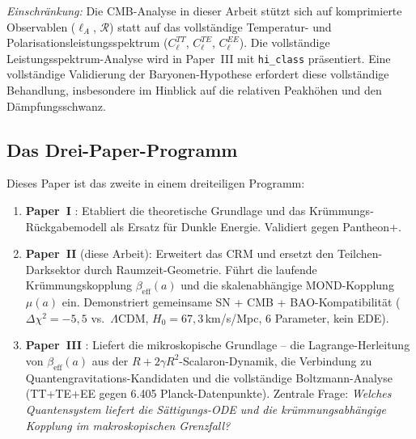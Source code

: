 \documentclass[aps,prd,twocolumn,superscriptaddress,nofootinbib,floatfix]{revtex4-2}
\begin{document}
\textit{Einschränkung:} Die CMB-Analyse in dieser Arbeit stützt sich auf komprimierte Observablen ($\ell_A$, $\mathcal{R}$) statt auf das vollständige Temperatur- und Polarisationsleistungsspektrum ($C_\ell^{TT}$, $C_\ell^{TE}$, $C_\ell^{EE}$). Die vollständige Leistungsspektrum-Analyse wird in Paper~III \cite{Geiger2026c} mit \texttt{hi\_class} präsentiert. Eine vollständige Validierung der Baryonen-Hypothese erfordert diese vollständige Behandlung, insbesondere im Hinblick auf die relativen Peakhöhen und den Dämpfungsschwanz.

\subsection{Das Drei-Paper-Programm}

Dieses Paper ist das zweite in einem dreiteiligen Programm:
\begin{enumerate}
\item \textbf{Paper~I} \cite{Geiger2026}: Etabliert die theoretische Grundlage und das Krümmungs-Rückgabemodell als Ersatz für Dunkle Energie. Validiert gegen Pantheon+.
\item \textbf{Paper~II} (diese Arbeit): Erweitert das CRM und ersetzt den Teilchen-Darksektor durch Raumzeit-Geometrie. Führt die laufende Krümmungskopplung $\beta_{\mathrm{eff}}(a)$ und die skalenabhängige MOND-Kopplung $\mu(a)$ ein. Demonstriert gemeinsame SN + CMB + BAO-Kompatibilität ($\Delta\chi^2 = -5{,}5$ vs.\ $\Lambda$CDM, $H_0 = 67{,}3$\,km/s/Mpc, 6 Parameter, kein EDE).
\item \textbf{Paper~III} \cite{Geiger2026c}: Liefert die mikroskopische Grundlage -- die Lagrange-Herleitung von $\beta_{\mathrm{eff}}(a)$ aus der $R + 2\gamma R^2$-Scalaron-Dynamik, die Verbindung zu Quantengravitations-Kandidaten und die vollständige Boltzmann-Analyse (TT+TE+EE gegen 6.405 Planck-Datenpunkte). Zentrale Frage: \textit{Welches Quantensystem liefert die Sättigungs-ODE und die krümmungsabhängige Kopplung im makroskopischen Grenzfall?}
\end{enumerate}
\end{document}
